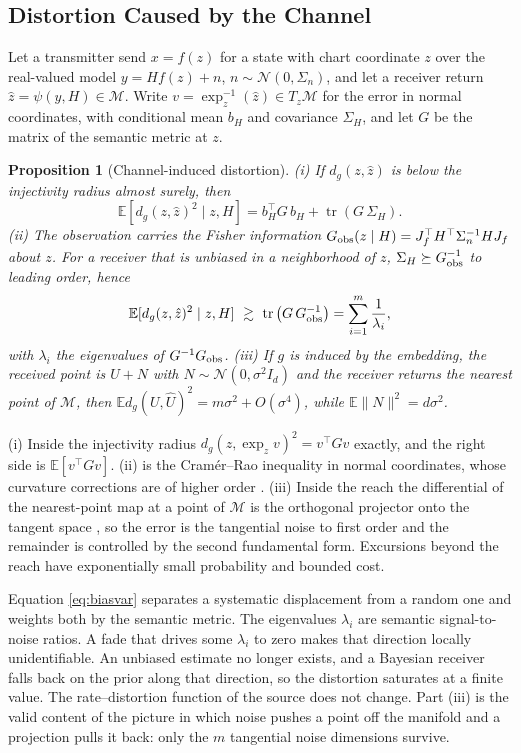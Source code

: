 \documentclass[10pt,journal]{IEEEtran}
\newtheorem{proposition}{Proposition}
\newcommand{\E}{\mathbb E}
\newcommand{\M}{\mathcal M}
\DeclareMathOperator{\tr}{tr}
\begin{document}
\subsection{Distortion Caused by the Channel}
Let a transmitter send $x=f(z)$ for a state with chart coordinate $z$ over the real-valued model $y=Hf(z)+n$, $n\sim\mathcal N(0,\Sigma_n)$, and let a receiver return $\hat z=\psi(y,H)\in\M$. Write $v=\exp_z^{-1}(\hat z)\in T_z\M$ for the error in normal coordinates, with conditional mean $b_H$ and covariance $\Sigma_H$, and let $G$ be the matrix of the semantic metric at $z$.
\begin{proposition}[Channel-induced distortion]\label{prop:channel}
(i) If $d_g(z,\hat z)$ is below the injectivity radius almost surely, then
\begin{equation}
 \E[d_g(z,\hat z)^2\mid z,H]=b_H^\top G\,b_H+\tr(G\,\Sigma_H). \label{eq:biasvar}
\end{equation}
(ii) The observation carries the Fisher information $G_{\rm obs}(z\mid H)=J_f^\top H^\top\Sigma_n^{-1}HJ_f$ about $z$. For a receiver that is unbiased in a neighborhood of $z$, $\Sigma_H\succeq G_{\rm obs}^{-1}$ to leading order, hence
\begin{equation}
 \E[d_g(z,\hat z)^2\mid z,H]\ \gtrsim\ \tr\big(G\,G_{\rm obs}^{-1}\big)=\sum_{i=1}^m\frac1{\lambda_i}, \label{eq:crb}
\end{equation}
with $\lambda_i$ the eigenvalues of $G^{-1}G_{\rm obs}$. (iii) If $g$ is induced by the embedding, the received point is $U+N$ with $N\sim\mathcal N(0,\sigma^2I_d)$ and the receiver returns the nearest point of $\M$, then $\E d_g(U,\hat U)^2=m\sigma^2+O(\sigma^4)$, while $\E\|N\|^2=d\sigma^2$.
\end{proposition}
\begin{IEEEproof}
(i) Inside the injectivity radius $d_g(z,\exp_zv)^2=v^\top Gv$ exactly, and the right side is $\E[v^\top Gv]$. (ii) is the Cram\'er--Rao inequality in normal coordinates, whose curvature corrections are of higher order \cite{smith2005covariance}. (iii) Inside the reach the differential of the nearest-point map at a point of $\M$ is the orthogonal projector onto the tangent space \cite{federer1959curvature}, so the error is the tangential noise to first order and the remainder is controlled by the second fundamental form. Excursions beyond the reach have exponentially small probability and bounded cost.
\end{IEEEproof}
Equation \eqref{eq:biasvar} separates a systematic displacement from a random one and weights both by the semantic metric. The eigenvalues $\lambda_i$ are semantic signal-to-noise ratios. A fade that drives some $\lambda_i$ to zero makes that direction locally unidentifiable. An unbiased estimate no longer exists, and a Bayesian receiver falls back on the prior along that direction, so the distortion saturates at a finite value. The rate--distortion function of the source does not change. Part (iii) is the valid content of the picture in which noise pushes a point off the manifold and a projection pulls it back: only the $m$ tangential noise dimensions survive.
\end{document}
